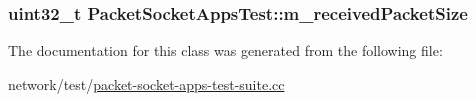 \subsubsection[{\texorpdfstring{m\+\_\+received\+Packet\+Size}{m_receivedPacketSize}}]{\setlength{\rightskip}{0pt plus 5cm}uint32\+\_\+t Packet\+Socket\+Apps\+Test\+::m\+\_\+received\+Packet\+Size\hspace{0.3cm}{\ttfamily [private]}}\hypertarget{classPacketSocketAppsTest_a0738bf3e280b06db8467f6b5bf14a6b0}{}\label{classPacketSocketAppsTest_a0738bf3e280b06db8467f6b5bf14a6b0}


The documentation for this class was generated from the following file\+:\begin{DoxyCompactItemize}
\item 
network/test/\hyperlink{packet-socket-apps-test-suite_8cc}{packet-\/socket-\/apps-\/test-\/suite.\+cc}\end{DoxyCompactItemize}
